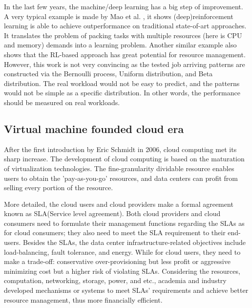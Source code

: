 \documentclass[sigchi]{acmart}
\begin{document}
In the last few years, the machine/deep learning has a big step of improvement. 
A very typical example is made by Mao et al. \cite{mao2016resource}, it shows (deep)reinforcement learning is able to achieve outperformance on traditional state-of-art approaches.
It translates the problem of packing tasks with multiple resources (here is CPU and memory) demands into a learning problem.
Another similar example\cite{8622393} also shows that the RL-based approach has great potential for resource management.
However, this work is not very convincing as the tested job arriving patterns are constructed via the Bernoulli process, Uniform distribution, and Beta distribution.
The real workload would not be easy to predict, and the patterns would not be simple as a specific distribution.
In other words, the performance should be measured on real workloads.


\subsection{Virtual machine founded cloud era}

After the first introduction by Eric Schmidt in 2006, cloud computing met its sharp increase.
The development of cloud computing is based on the maturation of virtualization technologies. 
The fine-granularity dividable resource enables users to obtain the 'pay-as-you-go' resources, and data centers can profit from selling every portion of the resource.

More detailed, the cloud users and cloud providers make a formal agreement known as SLA(Service level agreement).
Both cloud providers and cloud consumers need to formulate their management functions regarding the SLAs as for cloud consumers; they also need to meet the SLA requirement to their end-users.
Besides the SLAs, the data center infrastructure-related objectives include load-balancing, fault tolerance, and energy.
While for cloud users, they need to make a trade-off: conservative over-provisioning but less profit or aggressive minimizing cost but a higher risk of violating SLAs.
Considering the resources, computation, networking, storage, power, and etc., academia and industry developed mechanisms or systems to meet SLAs' requirements and achieve better resource management, thus more financially efficient. 
\end{document}
